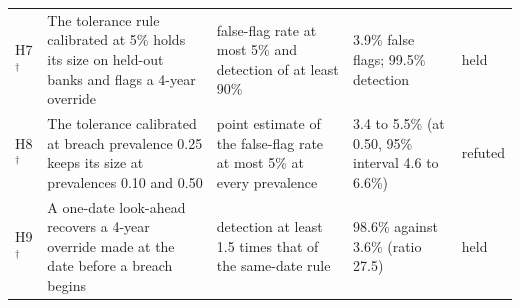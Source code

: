 \begin{table}[htbp]
\begin{tabular}{@{}l p{4.6cm} p{3.2cm} p{3.1cm} l@{}}
H7$^\dagger$ & The tolerance rule calibrated at 5\% holds its size on held-out banks and flags a 4-year override & false-flag rate at most 5\% and detection of at least 90\% & 3.9\% false flags; 99.5\% detection & held \\
H8$^\dagger$ & The tolerance calibrated at breach prevalence 0.25 keeps its size at prevalences 0.10 and 0.50 & point estimate of the false-flag rate at most 5\% at every prevalence & 3.4 to 5.5\% (at 0.50, 95\% interval 4.6 to 6.6\%) & refuted \\
H9$^\dagger$ & A one-date look-ahead recovers a 4-year override made at the date before a breach begins & detection at least 1.5 times that of the same-date rule & 98.6\% against 3.6\% (ratio 27.5) & held \\
\bottomrule
\end{tabular}
\end{table}
